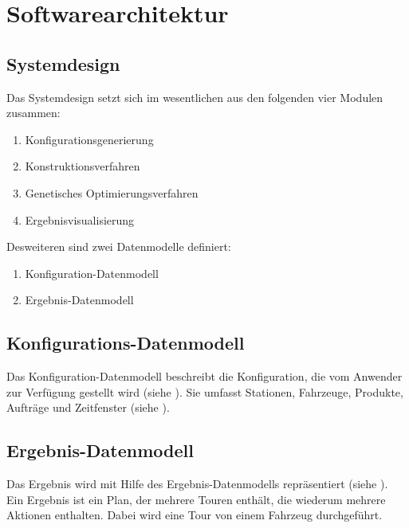 \section{Softwarearchitektur}

\subsection{Systemdesign}
Das Systemdesign setzt sich im wesentlichen aus den folgenden vier Modulen zusammen:
\begin{enumerate}
 \item Konfigurationsgenerierung
 \item Konstruktionsverfahren
 \item Genetisches Optimierungsverfahren
 \item Ergebnisvisualisierung
\end{enumerate}
Desweiteren sind zwei Datenmodelle definiert:
\begin{enumerate}
 \item Konfiguration-Datenmodell
 \item Ergebnis-Datenmodell
\end{enumerate}

\subsection{Konfigurations-Datenmodell}
Das Konfiguration-Datenmodell beschreibt die Konfiguration, die vom Anwender zur Verfügung gestellt wird (siehe ). Sie umfasst Stationen, Fahrzeuge, Produkte, Aufträge und Zeitfenster (siehe ).

\subsection{Ergebnis-Datenmodell}
Das Ergebnis wird mit Hilfe des Ergebnis-Datenmodells repräsentiert (siehe ). Ein Ergebnis ist ein Plan, der mehrere Touren enthält, die wiederum mehrere Aktionen enthalten. Dabei wird eine Tour von einem Fahrzeug durchgeführt.

